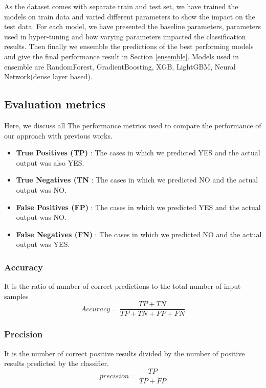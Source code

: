 \documentclass[14pt, conference]{IEEEtran}
\begin{document}
As the dataset comes with separate train and test set, we have trained the models on train data and varied different parameters to show the impact on the test data. For each model, we have presented the baseline parameters, parameters used in hyper-tuning and how varying parameters impacted the classification results.
Then finally we ensemble the predictions of the best performing models and give the final performance result in Section \ref{ensemble}. Models used in ensemble are RandomForest, GradientBoosting, XGB, LightGBM, Neural Network(dense layer based).


\subsection{Evaluation metrics}
Here, we discuss all The performance metrics used to compare the performance of our approach with previous works.
\begin{itemize}
    \item \textbf{True Positives (TP)} : The cases in which we predicted YES and the actual output was also YES.
    \item \textbf{True Negatives (TN} : The cases in which we predicted NO and the actual output was NO.
    \item \textbf{False Positives (FP)} : The cases in which we predicted YES and the actual output was NO.
    \item \textbf{False Negatives (FN)} : The cases in which we predicted NO and the actual output was YES.
\end{itemize}

\subsubsection{Accuracy}
It is the ratio of number of correct predictions to the total number of input samples
\begin{equation}
    Accuracy = \frac{TP+TN}{TP+TN+FP+FN}
\end{equation}

\subsubsection{Precision}
It is the number of correct positive results divided by the number of positive results predicted by the classifier.
\begin{equation}
    precision = \frac{TP}{TP+FP}
\end{equation}
\end{document}
